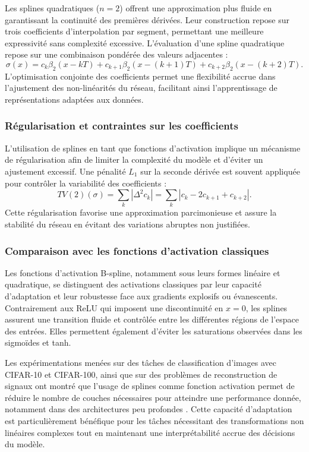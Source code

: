 \documentclass[a4paper, 12pt]{report} %
\begin{document}
Les splines quadratiques ($n=2$) offrent une approximation plus fluide en garantissant la continuité des premières dérivées. Leur construction repose sur trois coefficients d'interpolation par segment, permettant une meilleure expressivité sans complexité excessive. L'évaluation d'une spline quadratique repose sur une combinaison pondérée des valeurs adjacentes :
\begin{equation}
    \sigma(x) = c_k \beta_2(x - kT) + c_{k+1} \beta_2(x - (k+1)T) + c_{k+2} \beta_2(x - (k+2)T).
\end{equation}
L'optimisation conjointe des coefficients permet une flexibilité accrue dans l'ajustement des non-linéarités du réseau, facilitant ainsi l'apprentissage de représentations adaptées aux données.

\subsubsection{Régularisation et contraintes sur les coefficients}

L'utilisation de splines en tant que fonctions d'activation implique un mécanisme de régularisation afin de limiter la complexité du modèle et d'éviter un ajustement excessif. Une pénalité $L_1$ sur la seconde dérivée est souvent appliquée pour contrôler la variabilité des coefficients :
\begin{equation}
    TV(2)(\sigma) = \sum_k |\Delta^2 c_k| = \sum_k |c_k - 2c_{k+1} + c_{k+2}|.
\end{equation}
Cette régularisation favorise une approximation parcimonieuse et assure la stabilité du réseau en évitant des variations abruptes non justifiées.

\subsubsection{Comparaison avec les fonctions d'activation classiques}

Les fonctions d’activation B-spline, notamment sous leurs formes linéaire et quadratique, se distinguent des activations classiques par leur capacité d’adaptation et leur robustesse face aux gradients explosifs ou évanescents. Contrairement aux ReLU qui imposent une discontinuité en $x=0$, les splines assurent une transition fluide et contrôlée entre les différentes régions de l’espace des entrées. Elles permettent également d’éviter les saturations observées dans les sigmoïdes et tanh.

Les expérimentations menées sur des tâches de classification d'images avec CIFAR-10 et CIFAR-100, ainsi que sur des problèmes de reconstruction de signaux ont montré que l’usage de splines comme fonction activation permet de réduire le nombre de couches nécessaires pour atteindre une performance donnée, notamment dans des architectures peu profondes \cite{bohra2020learning}. Cette capacité d’adaptation est particulièrement bénéfique pour les tâches nécessitant des transformations non linéaires complexes tout en maintenant une interprétabilité accrue des décisions du modèle.
\end{document}
